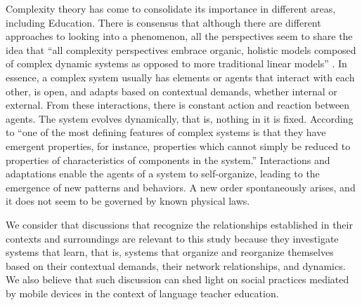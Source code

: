 Complexity theory has come to consolidate its importance in different areas, including Education. There is consensus that although there are different approaches to looking into a phenomenon, all the perspectives seem to share the idea that “all complexity perspectives embrace organic, holistic models composed of complex dynamic systems as opposed to more traditional linear models” \cite[p. 43]{mercer2012}. In essence, a complex system usually has elements or agents that interact with each other, is open, and adapts based on contextual demands, whether internal or external. From these interactions, there is constant action and reaction between agents. The system evolves dynamically, that is, nothing in it is fixed. According to \textcite[as quoted in Mercer, 2012, p. 43]{cilliers2010}
“one of the most defining features of complex systems is that they have emergent properties, for instance, properties which cannot simply be reduced to properties of characteristics of components in the system.” Interactions and adaptations enable the agents of a system to self-organize, leading to the emergence of new patterns and behaviors. A new order spontaneously arises, and it does not seem to be governed by known physical laws.

We consider that discussions that recognize the relationships established in their contexts and surroundings are relevant to this study because they investigate systems that learn, that is, systems that organize and reorganize themselves based on their contextual demands, their network relationships, and dynamics. We also believe that such discussion can shed light on social practices mediated by mobile devices in the context of language teacher education.